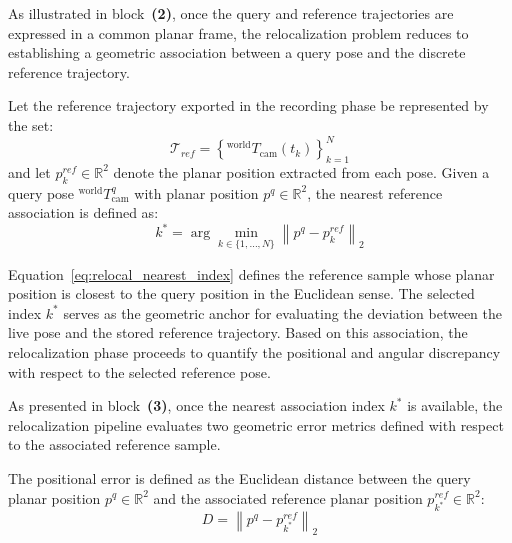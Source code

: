 \documentclass[a4paper,11pt]{article}
\begin{document}
As illustrated in block~\textbf{(2)}, once the query and reference trajectories are expressed in a common planar frame, the relocalization problem reduces to establishing a geometric association between a query pose and the discrete reference trajectory.

Let the reference trajectory exported in the recording phase be represented by the set: 
\begin{equation}
	\mathcal{T}_{ref}
	=
	\left\{
		{}^{\text{world}}\!T_{\text{cam}}(t_k)
	\right\}_{k=1}^{N}
	\label{eq:relocal_ref_set}
\end{equation}
and let $p_k^{ref}\in\mathbb{R}^2$ denote the planar position extracted from each pose. Given a query pose ${}^{\text{world}}\!T_{\text{cam}}^{q}$ with planar position $p^{q}\in\mathbb{R}^2$, the nearest reference association is defined as:
\begin{equation}
	k^{*}
	=
	\arg\min_{k \in \{1,\dots,N\}}
	\left\|
	p^{q} - p_k^{ref}
	\right\|_2
	\label{eq:relocal_nearest_index}
\end{equation}

Equation~\eqref{eq:relocal_nearest_index} defines the reference sample whose planar position is closest to the query position in the Euclidean sense. The selected index $k^{*}$ serves as the geometric anchor for evaluating the deviation between the live pose and the stored reference trajectory. Based on this association, the relocalization phase proceeds to quantify the positional and angular discrepancy with respect to the selected reference pose.


As presented in block~\textbf{(3)}, once the nearest association index $k^{*}$ is available, the relocalization pipeline evaluates two geometric error metrics defined with respect to the associated reference sample.

The positional error is defined as the Euclidean distance between the query planar position $p^{q}\in\mathbb{R}^2$ and the associated reference planar position $p^{ref}_{k^{*}}\in\mathbb{R}^2$:
\begin{equation}
	D
	=
	\left\|
	p^{q}
	-
	p^{ref}_{k^{*}}
	\right\|_2
	\label{eq:relocal_D}
\end{equation}
\end{document}

